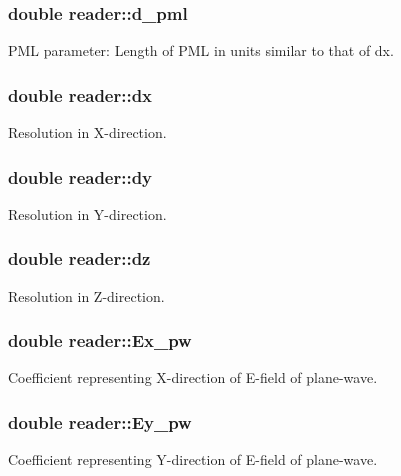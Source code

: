 \subsubsection[{\texorpdfstring{d\+\_\+pml}{d_pml}}]{\setlength{\rightskip}{0pt plus 5cm}double reader\+::d\+\_\+pml}\hypertarget{classreader_addd964c3a3d7100d78867d740ff42887}{}\label{classreader_addd964c3a3d7100d78867d740ff42887}
P\+ML parameter\+: Length of P\+ML in units similar to that of dx. 
\subsubsection[{\texorpdfstring{dx}{dx}}]{\setlength{\rightskip}{0pt plus 5cm}double reader\+::dx}\hypertarget{classreader_a1c09a3c058c59f01255f23f0f566e36d}{}\label{classreader_a1c09a3c058c59f01255f23f0f566e36d}
Resolution in X-\/direction. 
\subsubsection[{\texorpdfstring{dy}{dy}}]{\setlength{\rightskip}{0pt plus 5cm}double reader\+::dy}\hypertarget{classreader_a5285f6d49ca59e506700250462ea16fc}{}\label{classreader_a5285f6d49ca59e506700250462ea16fc}
Resolution in Y-\/direction. 
\subsubsection[{\texorpdfstring{dz}{dz}}]{\setlength{\rightskip}{0pt plus 5cm}double reader\+::dz}\hypertarget{classreader_a552c17427312cbdbabca1567bdf84939}{}\label{classreader_a552c17427312cbdbabca1567bdf84939}
Resolution in Z-\/direction. 
\subsubsection[{\texorpdfstring{Ex\+\_\+pw}{Ex_pw}}]{\setlength{\rightskip}{0pt plus 5cm}double reader\+::\+Ex\+\_\+pw}\hypertarget{classreader_aacebdb2fd7aa22550a4d650165af5bdb}{}\label{classreader_aacebdb2fd7aa22550a4d650165af5bdb}
Coefficient representing X-\/direction of E-\/field of plane-\/wave. 
\subsubsection[{\texorpdfstring{Ey\+\_\+pw}{Ey_pw}}]{\setlength{\rightskip}{0pt plus 5cm}double reader\+::\+Ey\+\_\+pw}\hypertarget{classreader_a2daf1aa46ce532cb6850061b4ab8450e}{}\label{classreader_a2daf1aa46ce532cb6850061b4ab8450e}
Coefficient representing Y-\/direction of E-\/field of plane-\/wave. 
